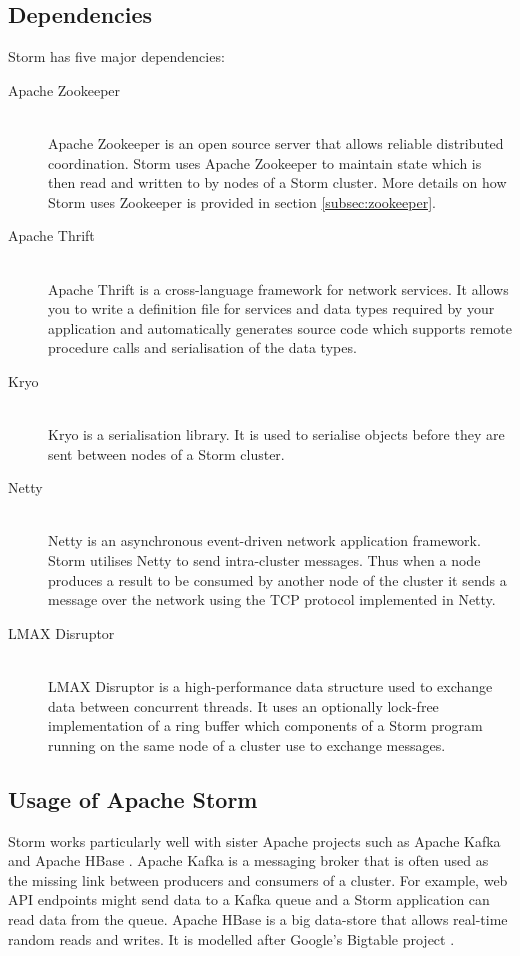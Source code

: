 \documentclass[bsc,twoside,singlespacing,normalheadings,parskip]{infthesis}\usepackage[]{graphicx}\usepackage[]{color}
\begin{document}
\subsection{Dependencies}

Storm has five major dependencies:

\begin{description}
	\item[Apache Zookeeper] \hfill \\
	Apache Zookeeper \citep{ApacheZookeeper} is an open source server that allows reliable distributed coordination. Storm uses Apache Zookeeper to maintain state which is then read and written to by nodes of a Storm cluster. More details on how Storm uses Zookeeper is provided in section \ref{subsec:zookeeper}.
	\item[Apache Thrift] \hfill \\
	Apache Thrift \citep{ApacheThrift} is a cross-language framework for network services. It allows you to write a definition file for services and data types required by your application and automatically generates source code which supports remote procedure calls and serialisation of the data types.
	\item[Kryo] \hfill \\
	Kryo \citep{EsotericKryo} is a serialisation library. It is used to serialise objects before they are sent between nodes of a Storm cluster.
	\item[Netty] \hfill \\
	Netty \citep{Netty} is an asynchronous event-driven network application framework. Storm utilises Netty to send intra-cluster messages. Thus when a node produces a result to be consumed by another node of the cluster it sends a message over the network using the TCP protocol implemented in Netty.
	\item[LMAX Disruptor] \hfill \\
	LMAX Disruptor \cite{LMAXDisruptor} is a high-performance data structure used to exchange data between concurrent threads. It uses an optionally lock-free implementation of a ring buffer which components of a Storm program running on the same node of a cluster use to exchange messages.
\end{description}

\subsection{Usage of Apache Storm}

Storm works particularly well with sister Apache projects such as Apache Kafka \cite{ApacheKafka} and Apache HBase \cite{ApacheHBase}. Apache Kafka is a messaging broker that is often used as the missing link between producers and consumers of a cluster. For example, web API endpoints might send data to a Kafka queue and a Storm application can read data from the queue. Apache HBase is a big data-store that allows real-time random reads and writes. It is modelled after Google's Bigtable project \cite{Chang:2008:BDS:1365815.1365816}.
\end{document}
